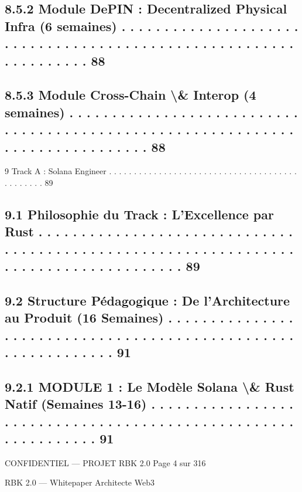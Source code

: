 \documentclass[12pt,landscape,a4paper]{article}
\newenvironment{confidential}
{\begin{tcolorbox}[
    colback=rbkred!5!white,
    colframe=rbkred!75!black,
    title=CONFIDENTIEL,
    fonttitle=\bfseries\color{white},
    coltitle=rbkred!75!black,
    breakable,
    enhanced,
    frame hidden,
    borderline west={2pt}{0pt}{rbkred!75!black}
]}
{\end{tcolorbox}}
\begin{document}
\subsection{8.5.2              Module DePIN : Decentralized Physical Infra (6 semaines) . . . . . . . . . . . . . . . . . . . . . . . . . . . . . . . . . . . . . . . . . . . . . . . . . . . . . . . . . . . . . . . . . 88}
\subsection{8.5.3              Module Cross-Chain \textbackslash{}& Interop (4 semaines) . . . . . . . . . . . . . . . . . . . . . . . . . . . . . . . . . . . . . . . . . . . . . . . . . . . . . . . . . . . . . . . . . . . . . . . . . . . . . . 88}
\vspace{0.5em}
9     Track A : Solana Engineer . . . . . . . . . . . . . . . . . . . . . . . . . . . . . . . . . . . . . . . . . . . . . . 89\\
\subsection{9.1     Philosophie du Track : L’Excellence par Rust . . . . . . . . . . . . . . . . . . . . . . . . . . . . . . . . . . . . . . . . . . . . . . . . . . . . . . . . . . . . . . . . . . . . . . . . . . . . . . . . . . . . . 89}
\subsection{9.2     Structure Pédagogique : De l’Architecture au Produit (16 Semaines) . . . . . . . . . . . . . . . . . . . . . . . . . . . . . . . . . . . . . . . . . . . . . . . . . . . . . . . . . . . . . . 91}
\subsection{9.2.1              MODULE 1 : Le Modèle Solana \textbackslash{}& Rust Natif (Semaines 13-16) . . . . . . . . . . . . . . . . . . . . . . . . . . . . . . . . . . . . . . . . . . . . . . . . . . . . . . . . . . . . . . 91}
\vspace{0.5em}
\vspace{0.5em}
\vspace{0.5em}
\begin{confidential}CONFIDENTIEL — PROJET RBK 2.0                                                                            Page 4 sur 316\end{confidential}
RBK 2.0 — Whitepaper Architecte Web3\\
\vspace{0.5em}
\vspace{0.5em}
\end{document}

